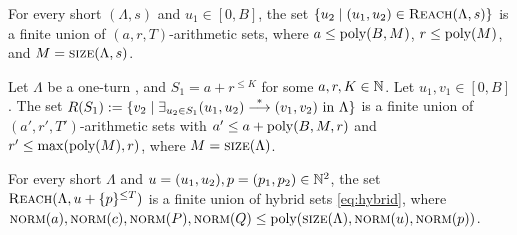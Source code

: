 \begin{appendixproof}
\begin{claim}\label{cl:prefix}
For every short \dslps $(\Lambda,s)$ 
and $u_1 \in [0,B]$,
the set $\{u_2 \mid (u_1, u_2) \in \textsc{Reach}(\Lambda,s)\}$ is a finite union of $(a, r, T)$-arithmetic sets, where
$a \leq \textup{poly}(B,M)$, $r \leq \textup{poly}(M)$, and $M=\textsc{size}(\Lambda,s)$.
\end{claim}
%
\begin{claim}\label{cl:infix}
Let $\Lambda$ be a one-turn \dslps,
and $S_1 = a + r^{\leq K}$ for some $a, r, K \in \mathbb{N}$.
Let $u_1, v_1 \in [0, B]$.
The set $R(S_1) := \{v_2 \mid \exists_{u_2 \in S_1} (u_1, u_2) \stackrel{*}{\longrightarrow} (v_1, v_2) \text{ in } \Lambda\}$
is a finite union of $(a', r', T')$-arithmetic sets with
$a' \leq a + \textup{poly}(B,M,r)$ and $r' \leq \max(\textup{poly}(M),r)$, where $M=\textsc{size}(\Lambda)$.
\end{claim}

%
%
%
\begin{claim}\label{cl:suffix}
For every short \dslps $\Lambda$ and $u= (u_1, u_2), p = (p_1, p_2)\in\mathbb{N}^2$, 
the set $\textsc{Reach}(\Lambda, u + \{p\}^{\leq T})$
is a finite union of hybrid sets \eqref{eq:hybrid},
where $\textsc{norm}(a), \textsc{norm}(c), \textsc{norm}(P), \textsc{norm}(Q) \leq \textup{poly}(\textsc{size}(\Lambda), \textsc{norm}(u),\textsc{norm}(p))$.
\end{claim}


\end{appendixproof}
